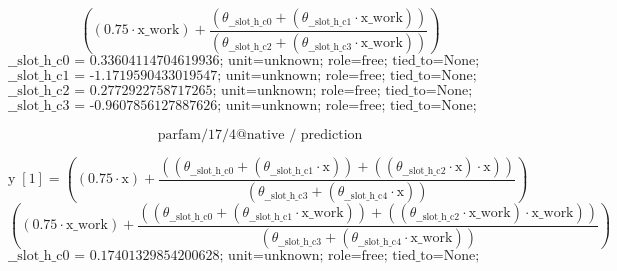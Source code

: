 \[\left(\left(0.75 \cdot \text{x\_work}\right) + \frac{\left(\theta_{\text{\_\_slot\_h\_c0}} + \left(\theta_{\text{\_\_slot\_h\_c1}} \cdot \text{x\_work}\right)\right)}{\left(\theta_{\text{\_\_slot\_h\_c2}} + \left(\theta_{\text{\_\_slot\_h\_c3}} \cdot \text{x\_work}\right)\right)}\right)\]
\[\text{\_\_slot\_h\_c0 = 0.33604114704619936; unit=unknown; role=free; tied\_to=None; bounds=[None, None]; origin=native\_coefficient\_block}\]
\[\text{\_\_slot\_h\_c1 = -1.1719590433019547; unit=unknown; role=free; tied\_to=None; bounds=[None, None]; origin=native\_coefficient\_block}\]
\[\text{\_\_slot\_h\_c2 = 0.2772922758717265; unit=unknown; role=free; tied\_to=None; bounds=[None, None]; origin=native\_normalized\_denominator\_coordinate}\]
\[\text{\_\_slot\_h\_c3 = -0.9607856127887626; unit=unknown; role=free; tied\_to=None; bounds=[None, None]; origin=native\_normalized\_denominator\_coordinate}\]
\noindent {}\par
\noindent {}\par
\noindent {}\par
\noindent {}\par
\[\text{parfam/17/4@native / prediction}\]
\noindent {}\par
\[\text{y}\;[\text{1}] = \left(\left(0.75 \cdot \text{x}\right) + \frac{\left(\left(\theta_{\text{\_\_slot\_h\_c0}} + \left(\theta_{\text{\_\_slot\_h\_c1}} \cdot \text{x}\right)\right) + \left(\left(\theta_{\text{\_\_slot\_h\_c2}} \cdot \text{x}\right) \cdot \text{x}\right)\right)}{\left(\theta_{\text{\_\_slot\_h\_c3}} + \left(\theta_{\text{\_\_slot\_h\_c4}} \cdot \text{x}\right)\right)}\right)\]
\[\left(\left(0.75 \cdot \text{x\_work}\right) + \frac{\left(\left(\theta_{\text{\_\_slot\_h\_c0}} + \left(\theta_{\text{\_\_slot\_h\_c1}} \cdot \text{x\_work}\right)\right) + \left(\left(\theta_{\text{\_\_slot\_h\_c2}} \cdot \text{x\_work}\right) \cdot \text{x\_work}\right)\right)}{\left(\theta_{\text{\_\_slot\_h\_c3}} + \left(\theta_{\text{\_\_slot\_h\_c4}} \cdot \text{x\_work}\right)\right)}\right)\]
\[\text{\_\_slot\_h\_c0 = 0.17401329854200628; unit=unknown; role=free; tied\_to=None; bounds=[None, None]; origin=native\_coefficient\_block}\]
